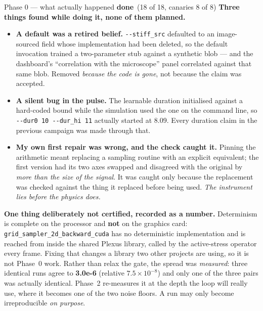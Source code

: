 \documentclass[11pt,a4paper]{article}
\newcommand{\code}[1]{\texttt{#1}}
\newcommand{\dn}{\textcolor{good}{\textbf{done}}}
\begin{document}
\begin{phasebox}{Phase 0 --- what actually happened \hfill \dn\ (18 of 18, canaries 8 of 8)}
\textbf{Three things found while doing it, none of them planned.}
\begin{itemize}
\item \textbf{A default was a retired belief.} \code{-{}-stiff\_src} defaulted to an image-sourced
field whose implementation had been deleted, so the default invocation trained a two-parameter
stub against a synthetic blob --- and the dashboard's ``correlation with the microscope'' panel
correlated against that same blob. Removed \emph{because the code is gone}, not because the claim
was accepted.
\item \textbf{A silent bug in the pulse.} The learnable duration initialised against a hard-coded
bound while the simulation used the one on the command line, so \code{-{}-dur0 10 -{}-dur\_hi 11}
actually started at 8.09. Every duration claim in the previous campaign was made through that.
\item \textbf{My own first repair was wrong, and the check caught it.} Pinning the arithmetic
meant replacing a sampling routine with an explicit equivalent; the first version had its two axes
swapped and disagreed with the original by \emph{more than the size of the signal}. It was caught
only because the replacement was checked against the thing it replaced before being used.
\emph{The instrument lies before the physics does.}
\end{itemize}

\textbf{One thing deliberately not certified, recorded as a number.} Determinism is complete on
the processor and \textbf{not} on the graphics card:
\code{grid\_sampler\_2d\_backward\_cuda} has no deterministic implementation and is reached from
inside the shared Plexus library, called by the active-stress operator every frame. Fixing that
changes a library two other projects are using, so it is not Phase~0 work. Rather than relax the
gate, the spread was \emph{measured}: three identical runs agree to \textbf{3.0e-6} (relative
$7.5\times10^{-8}$) and only one of the three pairs was actually identical. Phase~2 re-measures it
at the depth the loop will really use, where it becomes one of the two noise floors. A run may
only become irreproducible \emph{on purpose}.
\end{phasebox}
\end{document}
